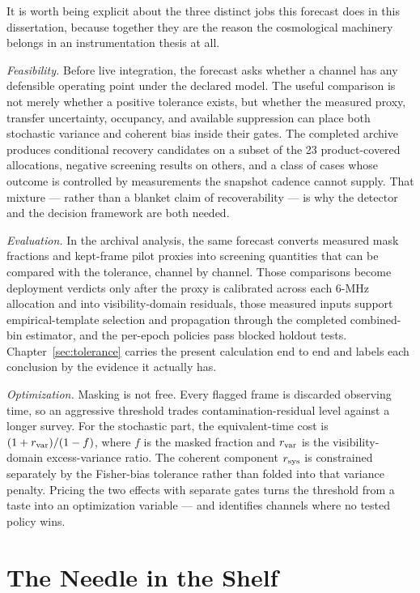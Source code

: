 It is worth being explicit about the three distinct jobs this forecast does in this dissertation, because together they are the reason the cosmological machinery belongs in an instrumentation thesis at all.

\emph{Feasibility.} Before live integration, the forecast asks whether a channel has any defensible operating point under the declared model. The useful comparison is not merely whether a positive tolerance exists, but whether the measured proxy, transfer uncertainty, occupancy, and available suppression can place both stochastic variance and coherent bias inside their gates. The completed archive produces conditional recovery candidates on a subset of the 23 product-covered allocations, negative screening results on others, and a class of cases whose outcome is controlled by measurements the snapshot cadence cannot supply. That mixture --- rather than a blanket claim of recoverability --- is why the detector and the decision framework are both needed.

\emph{Evaluation.} In the archival analysis, the same forecast converts measured mask fractions and kept-frame pilot proxies into screening quantities that can be compared with the tolerance, channel by channel. Those comparisons become deployment verdicts only after the proxy is calibrated across each 6-MHz allocation and into visibility-domain residuals, those measured inputs support empirical-template selection and propagation through the completed combined-bin estimator, and the per-epoch policies pass blocked holdout tests. Chapter~\ref{sec:tolerance} carries the present calculation end to end and labels each conclusion by the evidence it actually has.

\emph{Optimization.} Masking is not free. Every flagged frame is discarded observing time, so an aggressive threshold trades contamination-residual level against a longer survey. For the stochastic part, the equivalent-time cost is $(1+r_{\rm var})/(1-f)$, where $f$ is the masked fraction and $r_{\rm var}$ is the visibility-domain excess-variance ratio. The coherent component $r_{\rm sys}$ is constrained separately by the Fisher-bias tolerance rather than folded into that variance penalty. Pricing the two effects with separate gates turns the threshold from a taste into an optimization variable --- and identifies channels where no tested policy wins.

\section{The Needle in the Shelf}
\label{sec:intro:needle}

